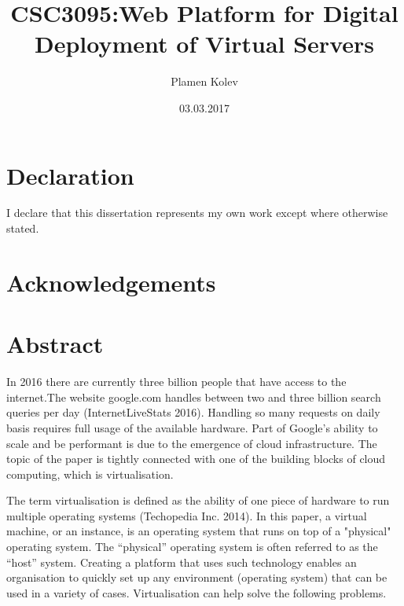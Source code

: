 \documentclass{article}
\title{CSC3095:Web Platform for Digital Deployment of Virtual Servers}
\date{03.03.2017}
\author{Plamen Kolev}
\begin{document}
  \maketitle

  \newpage
  \section{Declaration}
    I declare that this dissertation represents my own work except where otherwise stated.

  \section{Acknowledgements}


  \newpage
  \section{Abstract}
  In 2016 there are currently three billion people that have access to the internet.The website google.com handles between two and three billion search queries per day (InternetLiveStats 2016). Handling so many requests on daily basis requires full usage of the available hardware. Part of Google's ability to scale and be performant is due to the emergence of cloud infrastructure. The topic of the paper is tightly connected with one of the building blocks of cloud computing, which is virtualisation.
  
  The term virtualisation is defined as the ability of one piece of hardware to run multiple operating systems (Techopedia Inc. 2014). In this paper, a virtual machine, or an instance, is an operating system that runs on top of a "physical" operating system. The “physical” operating system is often referred to as the “host” system. Creating a platform that uses such technology enables an organisation to quickly set up any environment (operating system) that can be used in a variety of cases. Virtualisation can help solve the following problems.
	 
  \newpage
  \tableofcontents
  \newpage
  \listoffigures
  \newpage

  \newpage
\end{document}
